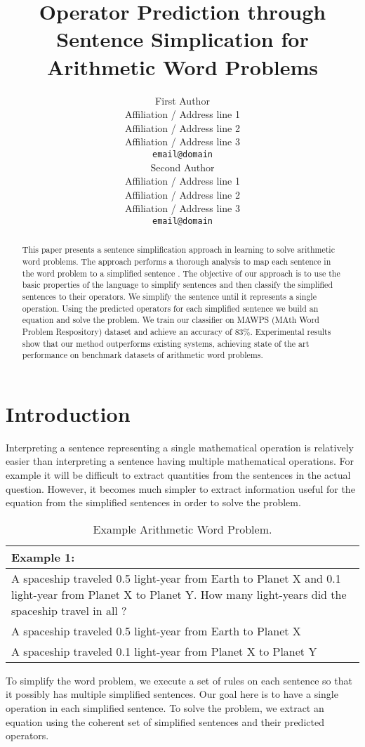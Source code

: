 \documentclass[11pt]{article}
\title{Operator Prediction through Sentence Simplication for Arithmetic Word Problems}
\author{First Author \\
  Affiliation / Address line 1 \\
  Affiliation / Address line 2 \\
  Affiliation / Address line 3 \\
  {\tt email@domain} \\\And
  Second Author \\
  Affiliation / Address line 1 \\
  Affiliation / Address line 2 \\
  Affiliation / Address line 3 \\
  {\tt email@domain} \\}
\date{}
\begin{document}
\maketitle
\begin{abstract}
 This paper presents a sentence simplification approach in learning to solve arithmetic word problems. The approach performs a thorough analysis to map each sentence in the word problem to a simplified sentence . The objective of our approach is to use the basic properties of the language to simplify sentences and then classify the simplified sentences to their operators. We simplify the sentence until it represents a single operation. Using the predicted operators for each simplified sentence we build an equation and solve the problem. We train our classifier on MAWPS (MAth Word Problem Respository) dataset and achieve an accuracy of 83\%.  Experimental results show that our method outperforms existing systems, achieving state of the art performance on benchmark datasets of arithmetic word problems.
\end{abstract}

\section{Introduction}
Interpreting a sentence representing a single mathematical operation is relatively easier than interpreting a sentence having multiple mathematical operations. For example it will be difficult to extract quantities from the sentences in the actual question. However, it becomes much simpler to extract information useful for the equation from the simplified sentences in order to solve the problem.

\begin{table}[h!]
\centering
\begin{tabular}{ | m{25em} | }
\hline
\textbf{Example 1:}\\
\hline
A spaceship traveled 0.5 light-year from Earth to Planet X and 0.1 light-year from Planet X to Planet Y. How many light-years did the spaceship travel in all ?\\
\hline
A spaceship traveled 0.5 light-year from Earth to Planet X \\
\hline
A spaceship traveled 0.1 light-year from Planet X to Planet Y \\
\hline
\end{tabular}
\caption{Example Arithmetic Word Problem.}
\label{figure:1}
\end{table}
			
To simplify the word problem, we execute a set of rules on each sentence so that it possibly has multiple simplified sentences. Our goal here is to have a single operation in each simplified sentence. To solve the problem, we extract an equation using the coherent set of simplified sentences and their predicted operators. 
\end{document}
